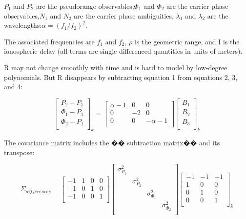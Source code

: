 $P_{1}$ and $P_{2}$ are the pseudorange observables,$\Phi_{1}$ and $\Phi_{2}$ are the carrier phase observables,$N_{1}$ and $N_{2}$ are the carrier phase ambiguities, $\lambda_{1}$ and $\lambda_{2}$ are the wavelengths:$\alpha=(f_{1}/f_{2})^{2}$.

The associated frequencies are $f_{1}$ and $f_{2}$, $\rho$ is the geometric range, and I is the ionospheric delay (all terms are single differenced quantities in units of meters).

R may not change smoothly with time and is hard to model by low-degree polynomials.
But R disappears by subtracting equation 1 from equations 2, 3, and 4:

\begin{equation}
\begin{bmatrix}
P_{2}-P_{1}\\
\Phi_{1}-P_{1}\\
\Phi_{2}-P_{1}\\
\end{bmatrix}_{k}
=\begin{bmatrix}
\alpha-1&0&0\\
0&-2&0\\
0&0&-\alpha-1\\
\end{bmatrix}
\begin{bmatrix}
B_{1}\\
B_{2}\\
B_{3}\\
\end{bmatrix}_{k}
\end{equation}

The covariance matrix includes the �� subtraction matrix�� and its transpose:

$$
\Sigma_{differences}
=
\begin{bmatrix}
-1&1&0&0\\
-1&0&1&0\\
-1&0&0&1\\
\end{bmatrix}
\begin{bmatrix}
\sigma_{P_{1}}^{2}& & & \\
& \sigma_{P_{2}}^{2} & &\\
& &\sigma_{\Phi_{1}}^{2} & \\
& & & \sigma_{\Phi_{2}}^{2} \\
\end{bmatrix}
\begin{bmatrix}
-1&-1&-1\\
1&0&0\\
0&1&0\\
0&0&1\\
\end{bmatrix}_{k}
$$

